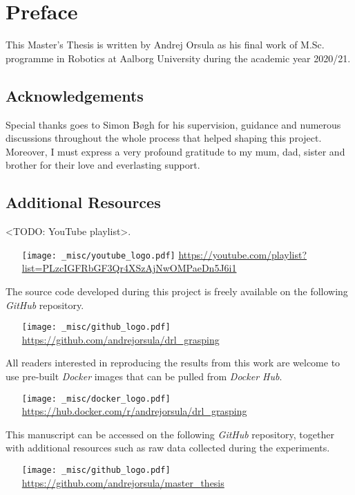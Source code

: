 \chapter*{Preface}

This Master’s Thesis is written by Andrej Orsula as his final work of M.Sc. programme in Robotics at Aalborg University during the academic year 2020/21.


\section*{Acknowledgements}

Special thanks goes to Simon Bøgh for his supervision, guidance and numerous discussions throughout the whole process that helped shaping this project.
Moreover, I must express a very profound gratitude to my mum, dad, sister and brother for their love and everlasting support.


\section*{Additional Resources}

\noindent
<TODO: YouTube playlist>.
\begin{itemize}
    \item[{\texttt{[image: \_misc/youtube\_logo.pdf]}}] \href{https://youtube.com/playlist?list=PLzcIGFRbGF3Qr4XSzAjNwOMPaeDn5J6i1}{https://youtube.com/playlist?list=PLzcIGFRbGF3Qr4XSzAjNwOMPaeDn5J6i1}
\end{itemize}

\noindent
The source code developed during this project is freely available on the following \textit{GitHub} repository.
\begin{itemize}
    \item[{\texttt{[image: \_misc/github\_logo.pdf]}}] \href{https://github.com/andrejorsula/drl_grasping}{https://github.com/andrejorsula/drl\_grasping}
\end{itemize}

\noindent
All readers interested in reproducing the results from this work are welcome to use pre-built \textit{Docker} images that can be pulled from \textit{Docker Hub}.
\begin{itemize}
    \item[{\texttt{[image: \_misc/docker\_logo.pdf]}}] \href{https://hub.docker.com/r/andrejorsula/drl_grasping}{https://hub.docker.com/r/andrejorsula/drl\_grasping}
\end{itemize}

\noindent
This manuscript can be accessed on the following \textit{GitHub} repository, together with additional resources such as raw data collected during the experiments.
\begin{itemize}
    \item[{\texttt{[image: \_misc/github\_logo.pdf]}}] \href{https://github.com/andrejorsula/master_thesis}{https://github.com/andrejorsula/master\_thesis}
\end{itemize}
